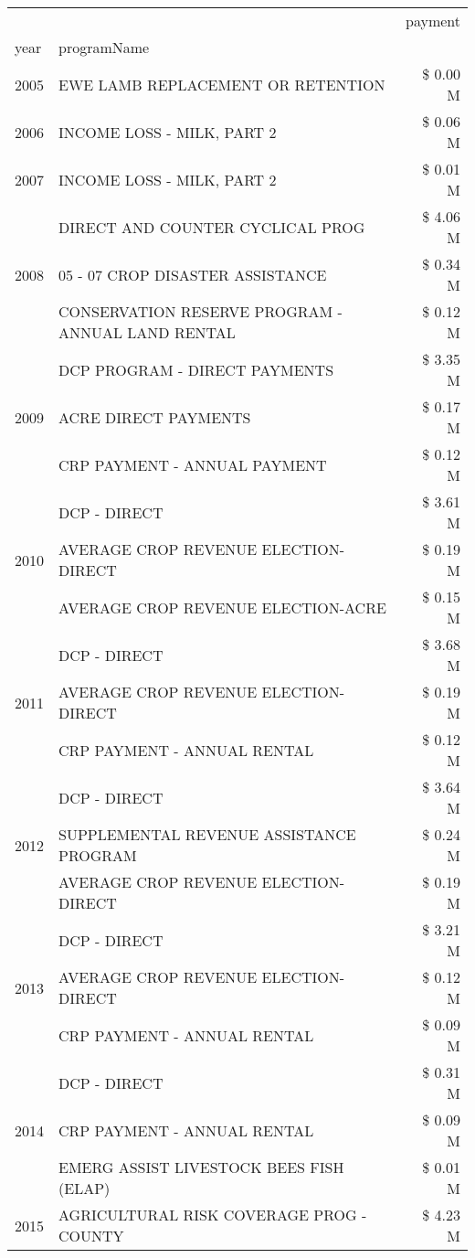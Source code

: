 \begin{tabular}{llr}
\toprule
 &  & payment \\
year & programName &  \\
\midrule
2005 & EWE LAMB REPLACEMENT OR RETENTION & \$ 0.00 M \\
\cline{1-3}
2006 & INCOME LOSS - MILK, PART 2 & \$ 0.06 M \\
\cline{1-3}
2007 & INCOME LOSS - MILK, PART 2 & \$ 0.01 M \\
\cline{1-3}
\multirow[t]{3}{*}{2008} & DIRECT AND COUNTER CYCLICAL PROG & \$ 4.06 M \\
 & 05 - 07 CROP DISASTER ASSISTANCE & \$ 0.34 M \\
 & CONSERVATION RESERVE PROGRAM - ANNUAL LAND RENTAL & \$ 0.12 M \\
\cline{1-3}
\multirow[t]{3}{*}{2009} & DCP PROGRAM - DIRECT PAYMENTS & \$ 3.35 M \\
 & ACRE DIRECT PAYMENTS & \$ 0.17 M \\
 & CRP PAYMENT - ANNUAL PAYMENT & \$ 0.12 M \\
\cline{1-3}
\multirow[t]{3}{*}{2010} & DCP - DIRECT & \$ 3.61 M \\
 & AVERAGE CROP REVENUE ELECTION-DIRECT & \$ 0.19 M \\
 & AVERAGE CROP REVENUE ELECTION-ACRE & \$ 0.15 M \\
\cline{1-3}
\multirow[t]{3}{*}{2011} & DCP - DIRECT & \$ 3.68 M \\
 & AVERAGE CROP REVENUE ELECTION-DIRECT & \$ 0.19 M \\
 & CRP PAYMENT - ANNUAL RENTAL & \$ 0.12 M \\
\cline{1-3}
\multirow[t]{3}{*}{2012} & DCP - DIRECT & \$ 3.64 M \\
 & SUPPLEMENTAL REVENUE ASSISTANCE PROGRAM & \$ 0.24 M \\
 & AVERAGE CROP REVENUE ELECTION-DIRECT & \$ 0.19 M \\
\cline{1-3}
\multirow[t]{3}{*}{2013} & DCP - DIRECT & \$ 3.21 M \\
 & AVERAGE CROP REVENUE ELECTION-DIRECT & \$ 0.12 M \\
 & CRP PAYMENT - ANNUAL RENTAL & \$ 0.09 M \\
\cline{1-3}
\multirow[t]{3}{*}{2014} & DCP - DIRECT & \$ 0.31 M \\
 & CRP PAYMENT - ANNUAL RENTAL & \$ 0.09 M \\
 & EMERG ASSIST LIVESTOCK BEES FISH (ELAP) & \$ 0.01 M \\
\cline{1-3}
\multirow[t]{3}{*}{2015} & AGRICULTURAL RISK COVERAGE PROG - COUNTY & \$ 4.23 M \\

\end{tabular}
